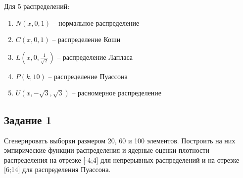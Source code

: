 Для 5 распределений:
\begin{enumerate}
	\item $N(x, 0, 1)$ -- нормальное распределение
	\item $C(x, 0, 1)$ -- распределение Коши
	\item $L(x, 0, \frac{1}{\sqrt{2}})$ -- распределение Лапласа 
	\item $P(k, 10)$ -- распределение Пуассона
	\item $U(x, -\sqrt{3}, \sqrt{3})$ -- расномерное распределение
\end{enumerate}

\subsection{Задание 1}
Сгенерировать выборки размером 20, 60 и 100 элементов.
Построить на них эмпирические функции распределения и ядерные оценки плотности распределения на отрезке [-4;4] для непрерывных распределений и на отрезке [6;14] для распределения Пуассона.
